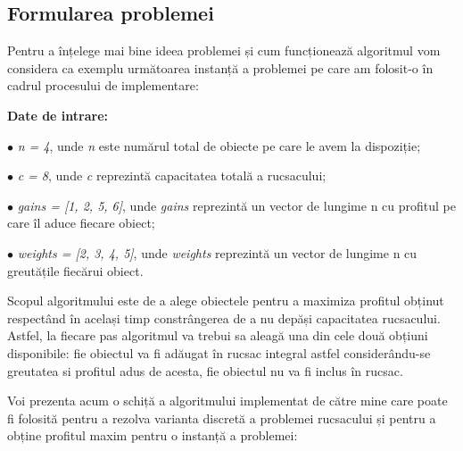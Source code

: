 \begin{sloppypar}
\subsection*{Formularea problemei}
Pentru a înțelege mai bine ideea problemei și cum funcționează algoritmul vom considera ca exemplu următoarea instanță a problemei pe care am folosit-o în cadrul procesului de implementare:
\begin{textbox}
\textbf{Date de intrare:} \par
$\bullet$ \textit{n = 4}, unde \textit{n} este numărul total de obiecte pe care le avem la dispoziție; \par
$\bullet$ \textit{c = 8}, unde \textit{c} reprezintă capacitatea totală a rucsacului; \par
$\bullet$ \textit{gains = [1, 2, 5, 6]}, unde \textit{gains} reprezintă un vector de lungime n cu profitul pe care îl aduce fiecare obiect; \par
$\bullet$ \textit{weights = [2, 3, 4, 5]}, unde \textit{weights} reprezintă un vector de lungime n cu greutățile fiecărui obiect.
\end{textbox}

Scopul algoritmului este de a alege obiectele pentru a maximiza profitul obținut respectând în același timp constrângerea de a nu depăși capacitatea rucsacului. Astfel, la fiecare pas algoritmul va trebui sa aleagă una din cele două obțiuni disponibile: fie obiectul va fi adăugat în rucsac integral astfel considerându-se greutatea si profitul adus de acesta, fie obiectul nu va fi inclus în rucsac. \par
Voi prezenta acum o schiță a algoritmului implementat de către mine care poate fi folosită pentru a rezolva varianta discretă a problemei rucsacului și pentru a obține profitul maxim pentru o instanță a problemei:


\end{sloppypar}
